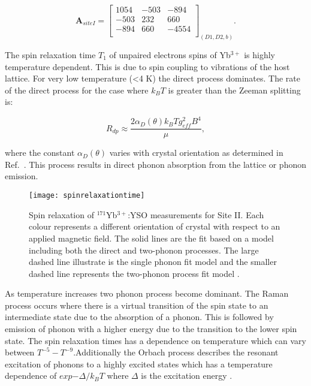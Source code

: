 \begin{equation}
\label{eq:AtensorsiteII}
\bm{A}_{siteI}=\begin{bmatrix}
1054 & -503 & -894 \\ 
-503 & 232 & 660\\ 
-894 & 660 & -4554 \\
\end{bmatrix}_{(D1,D2,b)}.
\end{equation}  

The spin relaxation time $T_{1}$ of unpaired electrons spins of Yb$^{3+}$ is highly temperature dependent. This is due to spin coupling to vibrations of the host lattice. For very low temperature (<4 K) the direct process dominates. The rate of the direct process for the case where $k_{B}T$ is greater than the Zeeman splitting is:

\begin{equation}
\label{eq:coloumbrep}
R_{dp} \approx \frac{2\alpha_{D}(\theta)k_{B} T g^{2}_{eff} B^{4}}{\mu},
\end{equation}

\noindent where the constant $\alpha_{D}(\theta)$ varies with crystal orientation as determined in Ref.~\citep{PhysRevB.97.064409}. This process results in direct phonon absorption from the lattice or phonon emission. 


\begin{figure}[h]
\centering
\texttt{[image: spinrelaxationtime]}
\caption{\label{fig:spinrelaxation}Spin relaxation of $^{171}$Yb$^{3+}$:YSO measurements for Site II. Each colour represents a different orientation of crystal with respect to an applied magnetic field. The solid lines are the fit based on a model including both the direct and two-phonon processes. The large dashed line illustrate is the single phonon fit model and the smaller dashed line represents the two-phonon process fit model \citep{PhysRevB.97.064409}.}
\end{figure}

As temperature increases two phonon process become dominant. The Raman process occurs where there is a virtual transition of the spin state to an intermediate state due to the absorption of a phonon. This is followed by emission of phonon with a higher energy due to the transition to the lower spin state. The spin relaxation times has a dependence on temperature which can vary between $T^{-5}-T^{-9}$.Additionally the Orbach process describes the resonant excitation of phonons to a highly excited states which has a temperature dependence of $exp{-\Delta/k_{B}T}$ where $\Delta$ is the excitation energy \citep{weil1994electron,doi:10.1002/pssb.2221170202}.

   




